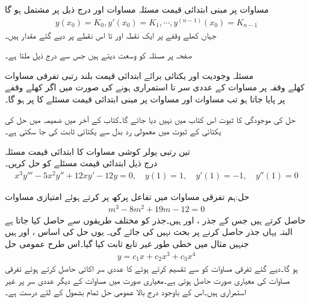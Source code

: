 مساوات  پر مبنی ابتدائی قیمت مسئلہ مساوات  اور درج ذیل   پر مشتمل ہو گا
\begin{align}\label{مساوات_سادہ+بلند_ابتدائی_شرائط}
y(x_0)=K_0, y'(x_0)=K_1,\cdots , y^{(n-1)}(x_0)=K_{n-1}
\end{align}
جہاں  کھلے وقفے  پر ایک نقطہ اور  تا  اس نقطے پر  دیے گئے مقدار ہیں۔

صفحہ  پر مسئلہ  کو وسعت دیتے ہیں جس سے درج ذیل ملتا ہے۔

\quad مسئلہ وجودیت اور یکتائی برائے ابتدائی قیمت بلند رتبی  تفرقی مساوات\\
کھلے وقفہ  پر مساوات  کے عددی سر  تا  استمراری ہونے کی صورت میں اگر  کھلے وقفے پر پایا جاتا ہو تب مساوات  اور مساوات  پر مبنی ابتدائی قیمت مسئلے کا  پر     ہو گا۔

حل کی موجودگی کا ثبوت اس کتاب میں نہیں دیا جائے گا۔کتاب کے آخر میں ضمیمہ  میں  حل کی یکتائی کے ثبوت میں معمولی رد بدل سے یکتائی ثابت کی جا سکتی ہے۔  

\quad تین رتبی یولر کوشی مساوات کا ابتدائی قیمت مسئلہ\\
درج ذیل ابتدائی قیمت مسئلے کو حل کریں۔
\begin{align*}
x^3y'''-5x^2y''+12xy'-12y=0,\quad y(1)=1, \quad y'(1)=-1, \quad y''(1)=0
\end{align*}

حل:ہم تفرقی مساوات میں  تفاعل پرکھ  پر کرتے ہوئے امتیازی مساوات
\begin{align*}
m^3-8m^2+19m-12=0
\end{align*}
حاصل کرتے ہیں جس کے جذر ،  اور  ہیں۔جذر  کو مختلف طریقوں سے حاصل کیا جاتا ہے البتہ یہاں جذر حاصل کرنے پر بحث نہیں کی جائے گی۔ یوں حل کی اساس ،  اور  ہیں جنہیں مثال  میں خطی طور غیر تابع ثابت کیا گیا۔اس طرح عمومی حل
\begin{align*}
y=c_1x+c_2x^3+c_3x^4
\end{align*}
ہو گا۔دیے گئے تفرقی مساوات کو   سے تقسیم کرتے ہوئے  کا عددی سر اکائی حاصل کرتے ہوئے تفرقی مساوات کی معیاری صورت حاصل ہوتی ہے۔معیاری صورت میں مساوات کے دیگر عددی سر  پر غیر استمراری ہیں۔اس کے باوجود درج بالا عمومی حل تمام  بشمول   کے لئے درست ہے۔ 

